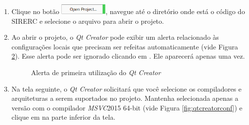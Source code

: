 \documentclass[a4paper,11pt]{article}
\newcommand{\sistema}{\textsf{SIRERC}}
\newcommand{\qtcreator}{\textit{Qt Creator}}
\newcommand{\msvc}{\textit{MSVC}}
\begin{document}
\begin{enumerate}
\begin{enumerate}
		\begin{figure}[H]\centering
			\caption{Tela inicial do \qtcreator{} e escolha de versão}\label{fig:qtcreatorver}
		\end{figure}
		
		\item Clique no botão \includegraphics[height=1.5em]{images/qtcreatoropen.png}, navegue até o diretório onde está o código do \sistema{} e selecione o arquivo  para abrir o projeto.
		
		\item Ao abrir o projeto, o \qtcreator{} pode exibir um alerta relacionado às configurações locais que precisam ser refeitas automaticamente (vide Figura \ref{fig:qtcreatoralert}). Esse alerta pode ser ignorado clicando em . Ele aparecerá apenas uma vez.
		
		\begin{figure}[H]\centering
			\caption{Alerta de primeira utilização do \qtcreator{}}\label{fig:qtcreatoralert}
		\end{figure}
		
		\item Na tela seguinte, o \qtcreator{} solicitará que você selecione os compiladores e arquiteturas a serem suportados no projeto. Mantenha selecionada apenas a versão com o compilador \msvc{}2015 64-bit (vide Figura \ref{fig:qtcreatorconf}) e clique em  na parte inferior da tela.
		

\end{enumerate}
\end{enumerate}
\end{document}
